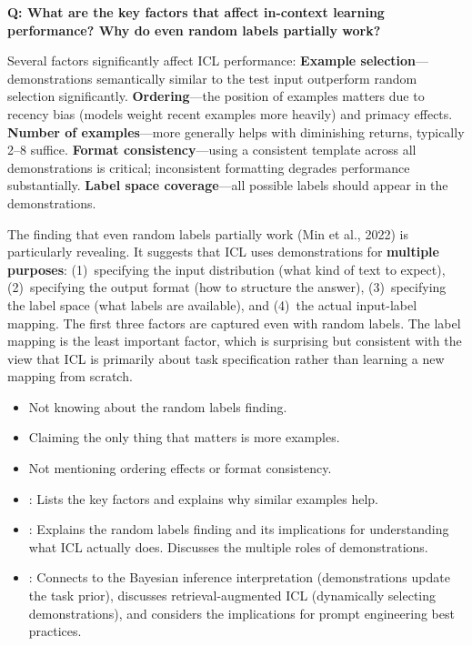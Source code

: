 \begin{interviewq}
\textbf{Q: What are the key factors that affect in-context learning
performance? Why do even random labels partially work?}

 \quad {} \quad
\badgefreq{\freqmed}

\stronganswer
Several factors significantly affect ICL performance:
\textbf{Example selection}---demonstrations semantically similar to the test
input outperform random selection significantly.
\textbf{Ordering}---the position of examples matters due to recency bias
(models weight recent examples more heavily) and primacy effects.
\textbf{Number of examples}---more generally helps with diminishing returns,
typically 2--8 suffice.
\textbf{Format consistency}---using a consistent template across all
demonstrations is critical; inconsistent formatting degrades performance
substantially.
\textbf{Label space coverage}---all possible labels should appear in the
demonstrations.

The finding that even random labels partially work (Min et al., 2022) is
particularly revealing.  It suggests that ICL uses demonstrations for
\textbf{multiple purposes}: (1)~specifying the input distribution (what kind
of text to expect), (2)~specifying the output format (how to structure the
answer), (3)~specifying the label space (what labels are available), and
(4)~the actual input-label mapping.  The first three factors are captured
even with random labels.  The label mapping is the least important factor,
which is surprising but consistent with the view that ICL is primarily about
task specification rather than learning a new mapping from scratch.

\redflags
\begin{itemize}
\item Not knowing about the random labels finding.
\item Claiming the only thing that matters is more examples.
\item Not mentioning ordering effects or format consistency.
\end{itemize}


\goodgreat
\begin{itemize}
\item {}: Lists the key factors and explains why similar
  examples help.
\item {}: Explains the random labels finding and its
  implications for understanding what ICL actually does.  Discusses
  the multiple roles of demonstrations.
\item {}: Connects to the Bayesian inference interpretation
  (demonstrations update the task prior), discusses retrieval-augmented
  ICL (dynamically selecting demonstrations), and considers the
  implications for prompt engineering best practices.
\end{itemize}


\end{interviewq}
